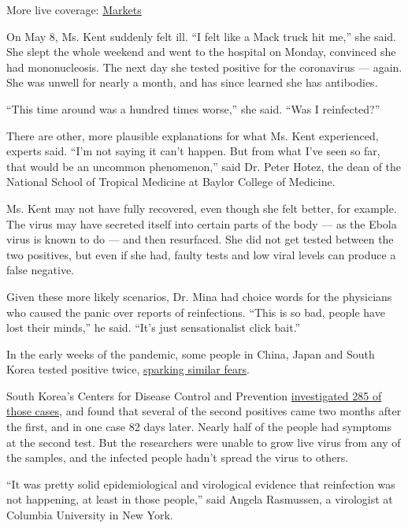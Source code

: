 More live coverage:
\href{https://www.nytimes.com/live/2020/08/03/business/stock-market-today-coronavirus?action=click\&pgtype=Article\&state=default\&region=MAIN_CONTENT_1\&context=storylines_live_updates}{Markets}

On May 8, Ms. Kent suddenly felt ill. ``I felt like a Mack truck hit
me,'' she said. She slept the whole weekend and went to the hospital on
Monday, convinced she had mononucleosis. The next day she tested
positive for the coronavirus --- again. She was unwell for nearly a
month, and has since learned she has antibodies.

``This time around was a hundred times worse,'' she said. ``Was I
reinfected?''

There are other, more plausible explanations for what Ms. Kent
experienced, experts said. ``I'm not saying it can't happen. But from
what I've seen so far, that would be an uncommon phenomenon,'' said Dr.
Peter Hotez, the dean of the National School of Tropical Medicine at
Baylor College of Medicine.

Ms. Kent may not have fully recovered, even though she felt better, for
example. The virus may have secreted itself into certain parts of the
body --- as the Ebola virus is known to do --- and then resurfaced. She
did not get tested between the two positives, but even if she had,
faulty tests and low viral levels can produce a false negative.

Given these more likely scenarios, Dr. Mina had choice words for the
physicians who caused the panic over reports of reinfections. ``This is
so bad, people have lost their minds,'' he said. ``It's just
sensationalist click bait.''

In the early weeks of the pandemic, some people in China, Japan and
South Korea tested positive twice,
\href{https://www.nytimes.com/2020/02/29/health/coronavirus-reinfection.html}{sparking
similar fears}.

South Korea's Centers for Disease Control and Prevention
\href{https://www.cdc.go.kr/board/board.es?mid=a30402000000\&bid=0030}{investigated
285 of those cases}, and found that several of the second positives came
two months after the first, and in one case 82 days later. Nearly half
of the people had symptoms at the second test. But the researchers were
unable to grow live virus from any of the samples, and the infected
people hadn't spread the virus to others.

``It was pretty solid epidemiological and virological evidence that
reinfection was not happening, at least in those people,'' said Angela
Rasmussen, a virologist at Columbia University in New York.

